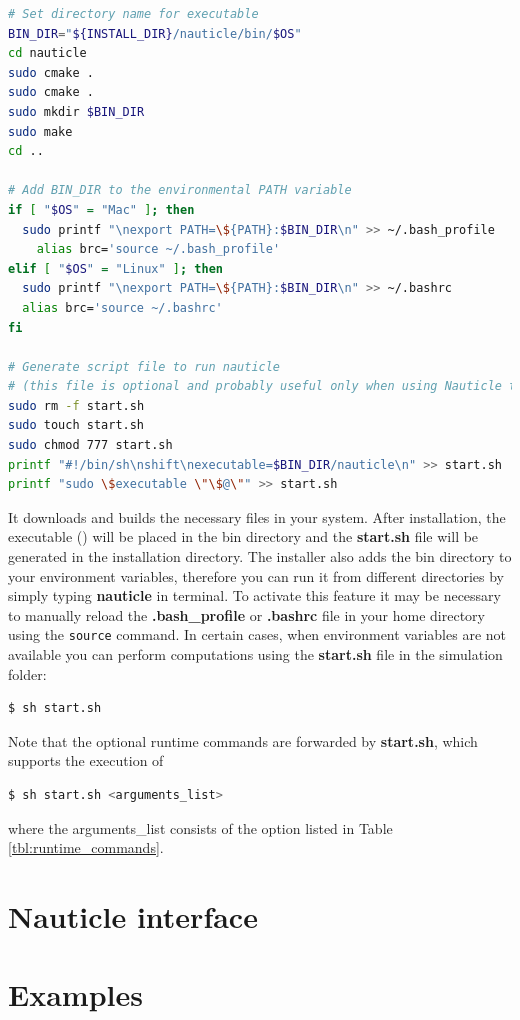 \documentclass[a4paper,12pt,openany]{book}
\theoremstyle{break}
\begin{document}
\begin{example}{\installer{}}{}
\begin{lstlisting}[language=bash]
# Set directory name for executable
BIN_DIR="${INSTALL_DIR}/nauticle/bin/$OS"
cd nauticle
sudo cmake .
sudo cmake .
sudo mkdir $BIN_DIR
sudo make
cd ..

# Add BIN_DIR to the environmental PATH variable
if [ "$OS" = "Mac" ]; then
  sudo printf "\nexport PATH=\${PATH}:$BIN_DIR\n" >> ~/.bash_profile
    alias brc='source ~/.bash_profile'
elif [ "$OS" = "Linux" ]; then
  sudo printf "\nexport PATH=\${PATH}:$BIN_DIR\n" >> ~/.bashrc
  alias brc='source ~/.bashrc'
fi

# Generate script file to run nauticle
# (this file is optional and probably useful only when using Nauticle through ssh)
sudo rm -f start.sh
sudo touch start.sh
sudo chmod 777 start.sh
printf "#!/bin/sh\nshift\nexecutable=$BIN_DIR/nauticle\n" >> start.sh
printf "sudo \$executable \"\$@\"" >> start.sh

\end{lstlisting}
\end{example}

It downloads and builds the necessary files in your system. After installation, the executable (\execname{}) will be placed in the bin directory and the \textbf{start.sh} file will be generated in the installation directory. The installer also adds the bin directory to your environment variables, therefore you can run it from different directories by simply typing \textbf{nauticle} in terminal. To activate this feature it may be necessary to manually reload the \textbf{.bash\_profile} or \textbf{.bashrc} file in your home directory using the \texttt{source} command.
In certain cases, when environment variables are not available you can perform computations using the \textbf{start.sh} file in the simulation folder:
\begin{lstlisting}[language=bash]
  $ sh start.sh
\end{lstlisting}
Note that the optional runtime commands are forwarded by \textbf{start.sh}, which supports the execution of
\begin{lstlisting}[language=bash]
  $ sh start.sh <arguments_list>
\end{lstlisting}
where the arguments\_list consists of the option listed in Table \ref{tbl:runtime_commands}.

\section{Nauticle interface} \label{sec:interface}

\section{Examples} \label{sec:examples}
\end{document}
